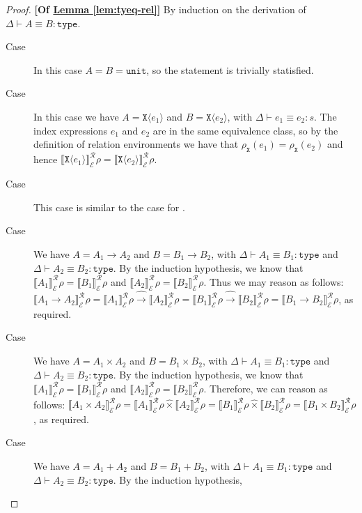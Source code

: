 \documentclass[natbib,preprint]{sigplanconf}
\newcommand{\relArrow}{\mathrel{\widehat\to}}
\newcommand{\relTimes}{\mathrel{\widehat\times}}
\newcommand{\sortType}{\texttt{type}}
\newcommand{\tyUnit}{\texttt{unit}}
\newcommand{\tyPrim}[2]{\texttt{#1}\langle #2 \rangle}
\newcommand{\tyPrimNm}[1]{\texttt{#1}}
\newcommand{\tyArr}{\to}
\newcommand{\tyProduct}{\times}
\newcommand{\relEnv}[1]{\mathcal{#1}}
\newcommand{\rsem}[3]{\llbracket #1 \rrbracket^{\mathcal{R}}_{#2}{#3}}
\newcommand{\lemref}[1]{\hyperref[#1]{Lemma \ref*{#1}}}
\begin{document}
\begin{proof}\textbf{[Of \lemref{lem:tyeq-rel}]}
  By induction on the derivation of $\Delta \vdash A \equiv B :
  \sortType$.
  \begin{description}
  \item[Case ] In this case $A = B = \tyUnit$, so
    the statement is trivially statisfied.
  \item[Case ] In this case we have $A =
    \tyPrim{X}{e_1}$ and $B = \tyPrim{X}{e_2}$, with $\Delta \vdash
    e_1 \equiv e_2 : s$. The index expressions $e_1$ and $e_2$ are in
    the same equivalence class, so by the definition of relation
    environments we have that $\rho_{\tyPrimNm{X}}(e_1) =
    \rho_{\tyPrimNm{X}}(e_2)$ and hence
    $\rsem{\tyPrim{X}{e_1}}{\relEnv{E}}\rho =
    \rsem{\tyPrim{X}{e_2}}{\relEnv{E}}\rho$.
  \item[Case ] This case is similar to the case
    for .
  \item[Case ] We have $A = A_1 \tyArr A_2$ and $B =
    B_1 \tyArr B_2$, with $\Delta \vdash A_1 \equiv B_1 : \sortType$
    and $\Delta \vdash A_2 \equiv B_2 : \sortType$. By the induction
    hypothesis, we know that $\rsem{A_1}{\relEnv{E}}\rho =
    \rsem{B_1}{\relEnv{E}}\rho$ and $\rsem{A_2}{\relEnv{E}}\rho =
    \rsem{B_2}{\relEnv{E}}\rho$. Thus we may reason as follows:
    $\rsem{A_1 \tyArr A_2}{\relEnv{E}}\rho =
    \rsem{A_1}{\relEnv{E}}\rho \relArrow \rsem{A_2}{\relEnv{E}}\rho =
    \rsem{B_1}{\relEnv{E}}\rho \relArrow \rsem{B_2}{\relEnv{E}}\rho =
    \rsem{B_1 \tyArr B_2}{\relEnv{E}}\rho$, as required.
  \item[Case ] We have $A = A_1 \tyProduct A_2$ and
    $B = B_1 \tyProduct B_2$, with $\Delta \vdash A_1 \equiv B_1 :
    \sortType$ and $\Delta \vdash A_2 \equiv B_2 : \sortType$. By the
    induction hypothesis, we know that $\rsem{A_1}{\relEnv{E}}\rho =
    \rsem{B_1}{\relEnv{E}}\rho$ and $\rsem{A_2}{\relEnv{E}}\rho =
    \rsem{B_2}{\relEnv{E}}\rho$. Therefore, we can reason as follows:
    $\rsem{A_1 \tyProduct A_2}{\relEnv{E}}\rho =
    \rsem{A_1}{\relEnv{E}}\rho \relTimes \rsem{A_2}{\relEnv{E}}\rho =
    \rsem{B_1}{\relEnv{E}}\rho \relTimes \rsem{B_2}{\relEnv{E}}\rho =
    \rsem{B_1 \tyProduct B_2}{\relEnv{E}}\rho$, as required.
  \item[Case ] We have $A = A_1 + A_2$ and $B = B_1 +
    B_2$, with $\Delta \vdash A_1 \equiv B_1 : \sortType$ and $\Delta
    \vdash A_2 \equiv B_2 : \sortType$. By the induction hypothesis,

\end{description}
\end{proof}
\end{document}
